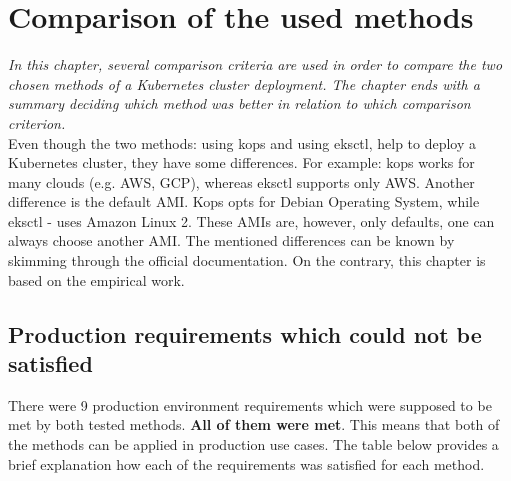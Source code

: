 \section{Comparison of the used methods}
\label{6-comp}
\textit{In this chapter, several comparison criteria are used in order to compare the two chosen methods of a Kubernetes cluster deployment. The chapter ends with a summary deciding which method was better in relation to which comparison criterion.}
\\

Even though the two methods: using kops and using eksctl, help to deploy a Kubernetes cluster, they have some differences. For example: kops works for many clouds (e.g. AWS, GCP), whereas eksctl supports only AWS. Another difference is the default AMI. Kops opts for Debian Operating System, while eksctl - uses Amazon Linux 2. These AMIs are, however, only defaults, one can always choose another AMI. The mentioned differences can be known by skimming through the official documentation. On the contrary, this chapter is based on the empirical work.

\subsection{Production requirements which could not be satisfied}

There were 9 production environment requirements which were supposed to be met by both tested methods. \textbf{All of them were met}. This means that both of the methods can be applied in production use cases. The table below provides a brief explanation how each of the requirements was satisfied for each method.

